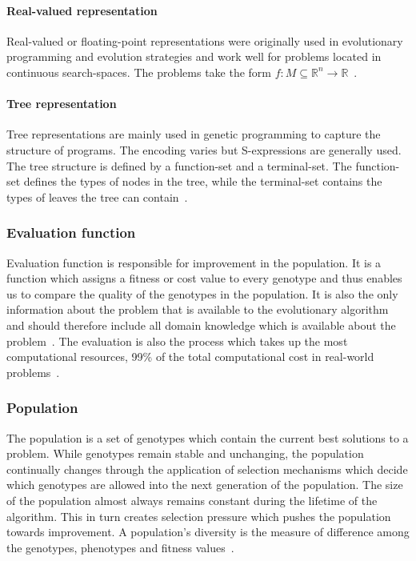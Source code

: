 \paragraph{Real-valued representation}

Real-valued or floating-point representations were originally used in evolutionary programming and evolution strategies and work well for problems located in continuous search-spaces. The problems take the form $f:M\subseteq \mathbb{R}^n \rightarrow \mathbb{R} $~\cite{back1997evolutionary}.

\paragraph{Tree representation}

Tree representations are mainly used in genetic programming to capture the structure of programs. The encoding varies but S-expressions are generally used. The tree structure is defined by a function-set and a terminal-set. The function-set defines the types of nodes in the tree, while the terminal-set contains the types of leaves the tree can contain~\cite{Eiben201511}.

\subsubsection{Evaluation function}

Evaluation function is responsible for improvement in the population. It is a function which assigns a fitness or cost value to every genotype and thus enables us to compare the quality of the genotypes in the population. It is also the only information about the problem that is available to the evolutionary algorithm and should therefore include all domain knowledge which is available about the problem~\cite{Eiben2015_whatevolutionary}. The evaluation is also the process which takes up the most computational resources, 99\% of the total computational cost in real-world problems~\cite{Eiben20021}.

\subsubsection{Population}

The population is a set of genotypes which contain the current best solutions to a problem. While genotypes remain stable and unchanging, the population continually changes through the application of selection mechanisms which decide which genotypes are allowed into the next generation of the population. The size of the population almost always remains constant during the lifetime of the algorithm. This in turn creates selection pressure which pushes the population towards improvement. A population's diversity is the measure of difference among the genotypes, phenotypes and fitness values~\cite{Eiben2015_whatevolutionary}.

